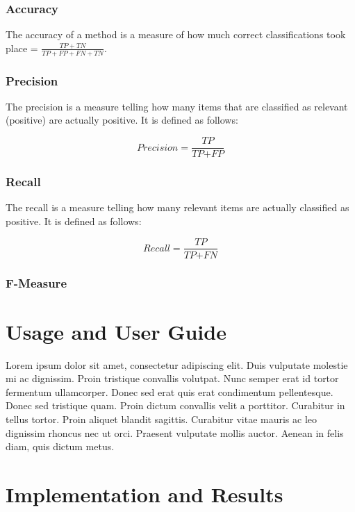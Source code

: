 \documentclass[11pt]{article}
\begin{document}
\subsubsection{Accuracy}
The accuracy of a method is a measure of how much correct classifications took place = $\frac{TP+TN}{TP+FP+FN+TN}$. 

\subsubsection{Precision}
The precision is a measure telling how many items that are classified as relevant (positive) are actually positive. It is defined as follows:

\begin{equation*}
\textit{Precision} = \frac{ \textit{TP}}{\textit{TP} + \textit{FP}}
\end{equation*}

\subsubsection{Recall}
The recall is a measure telling how many relevant items are actually classified as positive. It is defined as follows:

\begin{equation*}
\textit{Recall} = \frac{ \textit{TP}}{\textit{TP} + \textit{FN}}
\end{equation*}

\subsubsection{F-Measure}
 


\section{Usage and User Guide}
Lorem ipsum dolor sit amet, consectetur adipiscing elit. Duis vulputate molestie mi ac dignissim. Proin tristique convallis volutpat. Nunc semper erat id tortor fermentum ullamcorper. Donec sed erat quis erat condimentum pellentesque. Donec sed tristique quam. Proin dictum convallis velit a porttitor. Curabitur in tellus tortor. Proin aliquet blandit sagittis. Curabitur vitae mauris ac leo dignissim rhoncus nec ut orci. Praesent vulputate mollis auctor. Aenean in felis diam, quis dictum metus.

\section{Implementation and Results}
\end{document}
